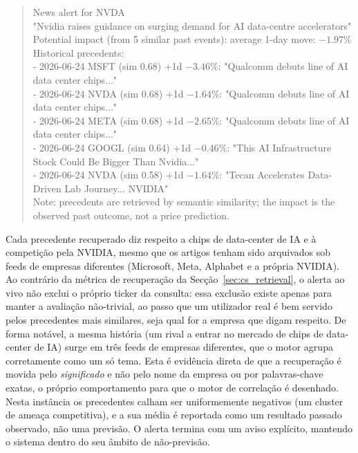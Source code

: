 \begin{quote}\ttfamily\small\raggedright
News alert for NVDA\\
"Nvidia raises guidance on surging demand for AI data-centre accelerators"\\[2pt]
Potential impact (from 5 similar past events): average 1-day move: $-1.97\%$\\
Historical precedents:\\
- 2026-06-24 MSFT (sim 0.68) +1d $-3.46\%$: "Qualcomm debuts line of AI data center chips..."\\
- 2026-06-24 NVDA (sim 0.68) +1d $-1.64\%$: "Qualcomm debuts line of AI data center chips..."\\
- 2026-06-24 META (sim 0.68) +1d $-2.65\%$: "Qualcomm debuts line of AI data center chips..."\\
- 2026-06-24 GOOGL (sim 0.64) +1d $-0.46\%$: "This AI Infrastructure Stock Could Be Bigger Than Nvidia..."\\
- 2026-06-24 NVDA (sim 0.58) +1d $-1.64\%$: "Tecan Accelerates Data-Driven Lab Journey... NVIDIA"\\[2pt]
Note: precedents are retrieved by semantic similarity; the impact is the observed past outcome,
not a price prediction.
\end{quote}

Cada precedente recuperado diz respeito a chips de data-center de IA e à competição pela NVIDIA, mesmo que os
artigos tenham sido arquivados sob feeds de empresas diferentes (Microsoft, Meta, Alphabet e a própria NVIDIA).
Ao contrário da métrica de recuperação da Secção~\ref{sec:cs_retrieval}, o alerta ao vivo não exclui o próprio
ticker da consulta: essa exclusão existe apenas para manter a avaliação não-trivial, ao passo que um utilizador
real é bem servido pelos precedentes mais similares, seja qual for a empresa que digam respeito. De forma
notável, a mesma história (um rival a entrar no mercado de chips de data-center de IA) surge em três feeds de
empresas diferentes, que o motor agrupa corretamente como um só tema. Esta é evidência direta de que a
recuperação é movida pelo \emph{significado} e não pelo nome da empresa ou por palavras-chave exatas, o próprio
comportamento para que o motor de correlação é desenhado. Nesta instância os precedentes calham ser
uniformemente negativos (um cluster de ameaça competitiva), e a sua média é reportada como um resultado passado
observado, não uma previsão. O alerta termina com um aviso explícito, mantendo o sistema dentro do seu âmbito
de não-previsão.


